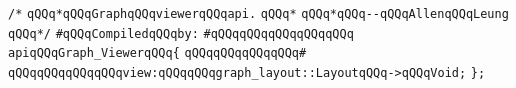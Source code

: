 \label{src/lib/compiler/back/low/display/graph-viewer.api}
\verb|/*|\newline
\verb|qQQq*qQQqGraphqQQqviewerqQQqapi.|\newline
\verb|qQQq*|\newline
\verb|qQQq*qQQq--qQQqAllenqQQqLeung|\newline
\verb|qQQq*/|\newline
\newline
\verb|#qQQqCompiledqQQqby:|\newline
\verb|#qQQqqQQqqQQqqQQqqQQq|\newline
\newline
\verb|apiqQQqGraph_ViewerqQQq{|\newline
\verb|qQQqqQQqqQQqqQQq#|\newline
\verb|qQQqqQQqqQQqqQQqview:qQQqqQQqgraph_layout::LayoutqQQq->qQQqVoid;|\newline
\verb|};|\newline
\newline

